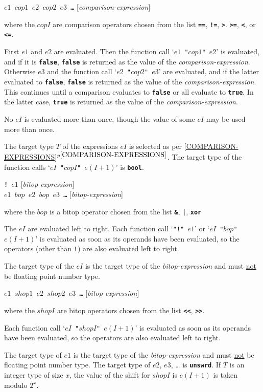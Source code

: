 \documentclass[12pt]{article}
\newcommand{\TT}[1]{{\tt \bfseries #1}}
\newcommand{\itemref}[1]{\ref{#1}$^{p\pageref{#1}}$}
\newenvironment{indpar}[1][0.3in]%
	{\begin{list}{}%
		     {\setlength{\itemsep}{0in}%
		      \setlength{\topsep}{0in}%
		      \setlength{\parsep}{1ex}%
		      \setlength{\labelwidth}{#1}%
		      \setlength{\leftmargin}{#1}%
		      \addtolength{\leftmargin}{\labelsep}}%
	 \item}%
	{\end{list}}
\begin{document}
\TT{$e1$ $cop1$ $e2$ $cop2$ $e3$ \ldots{}}
\hfill [{\em comparison-expression}]
\begin{indpar}
where the $copI$ are comparison operators chosen from the list
\TT{==}, \TT{!=}, \TT{>}. \TT{>=}, \TT{<}, or \TT{<=}.

First $e1$ and $e2$ are evaluated.  Then the function call
`{\tt $e1$ "$cop1$" $e2$}'
is evaluated, and if it is \TT{false},
\TT{false} is returned as the value of the {\em comparison-expression}.
Otherwise $e3$ and the function call `{\tt $e2$ "$cop2$" $e3$}'
are evaluated, and if the latter
evaluated to \TT{false},
\TT{false} is returned as the value of the {\em comparison-expression}.
This continues until a comparison evaluates to \TT{false} or all
evaluate to \TT{true}.  In the latter case, \TT{true} is returned as
the value of the {\em comparison-expression}.

No $eI$ is evaluated more than once, though the value of some $eI$
may be used more than once.

The target type $T$ of the expressions $eI$ is selected as
per \itemref{COMPARISON-EXPRESSIONS}.  The target type of the
function calls `{\tt $eI$ "$copI$" $e(I+1)$}' is \TT{bool}.
\end{indpar}

\TT{! $e1$}
\hfill [{\em bitop-expression}] \\
\TT{$e1$ $bop$ $e2$ $bop$ $e3$ \ldots{}}
\hfill [{\em bitop-expression}]
\begin{indpar}
where the $bop$ is a bitop operator chosen from the list
\TT{\&}, \TT{|}, \TT{xor}

The $eI$ are evaluated left to right.
Each function call
`{\tt "!" $e1$}' or
`{\tt $eI$ "$bop$" $e(I+1)$}' is evaluated as soon as its operands have
been evaluated, so the operators (other than \TT{!}) are
also evaluated left to right.

The target type of the $eI$ is the target type of the
{\em bitop-expression} and must \underline{not} be floating
point number type.
\end{indpar}

\TT{$e1$ $shop1$ $e2$ $shop2$ $e3$ \ldots{}}
\hfill [{\em bitop-expression}]
\begin{indpar}
where the $shopI$ are bitop operators chosen from the list
\TT{<{}<}, \TT{>{}>}.

Each function call
`{\tt $eI$ "$shopI$" $e(I+1)$}' is evaluated as soon as its operands have
been evaluated, so the operators are
also evaluated left to right.

The target type of $e1$ is the target type of the
{\em bitop-expression} and must \underline{not} be floating
point number type.
The target type of $e2$, $e3$, \ldots{} is \TT{unswrd}.
If $T$ is an integer type of size $x$,
the value of the shift for $shopI$
is $e(I+1)$ is taken modulo $2^x$.
\end{indpar}
\end{document}
